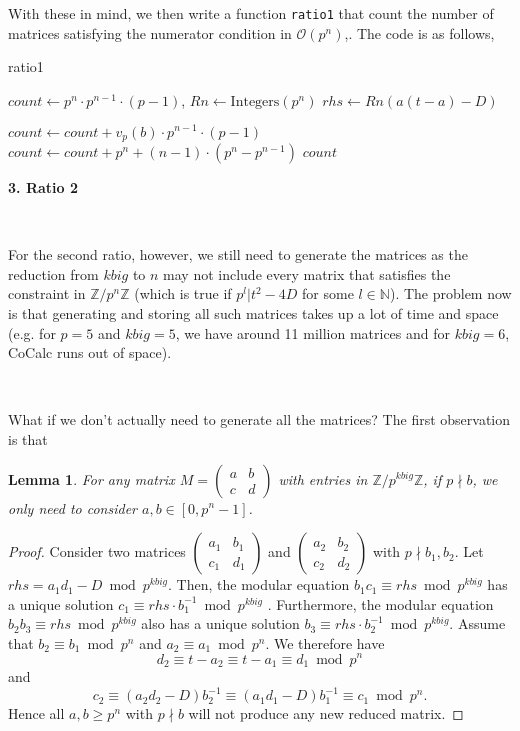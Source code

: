 \documentclass[letterpaper,12pt]{article}
\newtheorem{lemma}{Lemma}
\newcommand{\Z}{\mathbb{Z}}
\newcommand{\bigO}{\mathcal{O}}
\begin{document}
With these in mind, we then write a function \texttt{ratio1}
that count the number of matrices satisfying the numerator condition in $\bigO(p^n)$,.
The code is as follows,
\begin{algorithm}[H]
\caption{ratio1}
\begin{algorithmic}[1]
    \State $count \gets p^n \cdot p^{n-1} \cdot (p - 1)$, $Rn \gets \text{Integers}(p^n)$
        \State $rhs \gets Rn(a(t-a) - D)$

            \State $count \gets count + v_p(b) \cdot p^{n-1} \cdot (p - 1)$
        \Else
            \State $count \gets count + p^n + (n - 1) \cdot (p^n - p^{n-1})$
        \EndIf
    \EndFor
    \State \Return $count$
\EndFunction
\end{algorithmic}
\end{algorithm}

\newpage

{\bf \LARGE 3. Ratio 2}

\

For the second ratio, however, we still need to generate the matrices 
as the reduction from $kbig$ to $n$ may not include every matrix that satisfies the constraint 
in $\Z / p^n\Z$ (which is true if $p^l | t^2-4D$ for some $l \in \mathbb{N}$).
The problem now is that generating and storing all such matrices takes 
up a lot of time and space (e.g. for $p=5$ and $kbig=5$, we have around 11 million matrices
and for $kbig=6$, CoCalc runs out of space).

\

What if we don't actually need to generate all the matrices?
The first observation is that 
\begin{lemma}
For any matrix $M = \begin{pmatrix} a & b \\ c & d \end{pmatrix}$
with entries in $\Z/p^{kbig}\Z$,
if $p \nmid b$, we only need to consider $a, b \in [0, p^n-1]$.
\end{lemma}
\begin{proof}
Consider two matrices $\begin{pmatrix} a_1 & b_1 \\ c_1 & d_1 \end{pmatrix}$ and
$\begin{pmatrix} a_2 & b_2 \\ c_2 & d_2 \end{pmatrix}$
with $p \nmid b_1, b_2$.
Let $rhs = a_1d_1-D \bmod p^{kbig}$.
Then, the modular equation $b_1c_1 \equiv rhs \bmod p^{kbig}$ has a unique solution 
$c_1 \equiv rhs \cdot b_1^{-1} \bmod p^{kbig}$ .
Furthermore, the modular equation $b_2b_3 \equiv rhs \bmod p^{kbig}$
also has a unique solution $b_3 \equiv rhs \cdot b_2^{-1} \bmod p^{kbig}$.
Assume that $b_2 \equiv b_1 \bmod p^n$ and $a_2 \equiv a_1 \bmod p^n$.
We therefore have
\[
d_2 \equiv t-a_2 \equiv t-a_1 \equiv d_1 \bmod p^n
\] 
and
\[
c_2 \equiv (a_2d_2 - D)b_2^{-1} 
\equiv (a_1d_1 - D)b_1^{-1} 
\equiv c_1 \bmod p^n.
\]
Hence all $a,b \geq p^n$ with $p \nmid b$ will not 
produce any new reduced matrix.
\end{proof}
\end{document}
